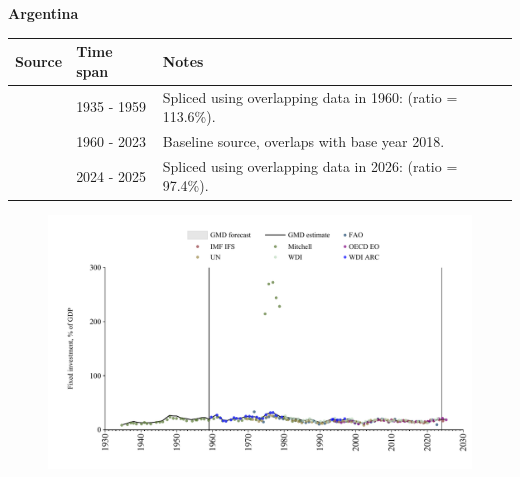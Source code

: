 \documentclass[12pt,a4paper,landscape]{article}
\begin{document}
\begin{adjustbox}{max totalsize={\paperwidth}{\paperheight},center}
\begin{minipage}[t][\textheight][t]{\textwidth}
\vspace*{0.5cm}
{}
\begin{center}
{\Large\bfseries Argentina}
\end{center}
\vspace{0.5cm}
\begin{table}[H]
\centering
\small
\begin{tabular}{|l|l|l|}
\hline
\textbf{Source} & \textbf{Time span} & \textbf{Notes} \\
\hline
\rowcolor{white}\cite{Mitchell}& 1935 - 1959 &Spliced using overlapping data in 1960: (ratio = 113.6\%).\\
\rowcolor{lightgray}\cite{WDI}& 1960 - 2023 &Baseline source, overlaps with base year 2018.\\
\rowcolor{white}\cite{OECD_EO}& 2024 - 2025 &Spliced using overlapping data in 2026: (ratio = 97.4\%).\\
\hline
\end{tabular}
\end{table}
\begin{figure}[H]
\centering
\includegraphics[width=\textwidth,height=0.6\textheight,keepaspectratio]{graphs/ARG_finv_GDP.pdf}
\end{figure}
\end{minipage}
\end{adjustbox}
\end{document}
